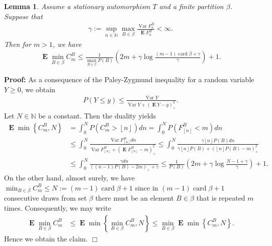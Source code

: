 \documentclass[a4paper,12pt]{article}
\newcommand{\okra}[1]{\left( #1 \right)}
\newcommand{\klam}[1]{\left\{ #1 \right\}}
\newcommand{\floor}[1]{\left\lfloor #1 \right\rfloor}
\DeclareMathOperator{\card}{card}
\DeclareMathOperator{\var}{Var}
\DeclareMathOperator{\mean}{\mathbf{E}}
\newtheorem{lemma}{Lemma}
\newenvironment*{proof}{\begin{trivlist}\item[]
\noindent\textbf{Proof:}}{$\Box$\par\end{trivlist}}
\begin{document}
\begin{lemma}
  \label{theoShortMemory}
  Assume a stationary automorphism $T$ and a finite partition $\beta$.
  Suppose that
  \begin{align}
    \gamma:=
    \sup_{n\in\mathbb{N}}\max_{B\in\beta}\frac{\var F^B_n}{\mean F^B_n}<\infty.
  \end{align}
  Then for $m>1$, we have
  \begin{align}
    \mean \min_{B\in\beta} C^B_m\le
    \frac{1}{\max_{B\in\beta} P(B)}\okra{
    2m+\gamma\log\frac{(m-1)\card\beta+\gamma}{\gamma}
    }+1
    .
  \end{align}
\end{lemma}
\begin{proof}
  As a consequence of the Paley-Zygmund inequality for a random
  variable $Y\ge 0$, we obtain
  \begin{align}
    P(Y\le y)\le\frac{\var Y}{\var Y+(\mean Y-y)_+^2}.
  \end{align}
  Let $N\in\mathbb{N}$ be a constant. Then the duality yields
  \begin{align}
    \mean \min\klam{C^B_m,N}
    &=
    \int_0^{N} P(C^B_m>\floor{n}) dn
    =
      \int_0^{N} P(F^B_{\floor{n}}<m) dn
      \nonumber\\
    &\le \int_0^{N} \frac{\var F^B_{\floor{n}}
      dn}{\var F^B_{\floor{n}}+(\mean F^B_{\floor{n}}-m)_+^2}
    \le \int_0^{N} \frac{\gamma \floor{n}P(B)
      dn}{\gamma \floor{n}P(B)+(\floor{n}P(B)-m)_+^2}
      \nonumber\\
    &\le \int_0^{N}
      \frac{\gamma dn}{((n-1)P(B)-2m)_++\gamma}
      \le \frac{1}{P(B)}\okra{2m+
      \gamma\log\frac{N-1+\gamma}{\gamma}}+1
      .
  \end{align}
  On the other hand, almost surely, we have
  $\min_{B\in\beta} C^B_m\le N:=(m-1)\card\beta+1$
  since in $(m-1)\card\beta+1$ consecutive draws from set $\beta$
  there must be an element $B\in\beta$ that is repeated $m$ times.
  Consequently, we may write
  \begin{align}
    \mean \min_{B\in\beta} C^B_m
    &\le \mean \min\klam{\min_{B\in\beta} C^B_m,N}
      \le \min_{B\in\beta} \mean \min\klam{C^B_m, N}
      .
  \end{align}
  Hence we obtain the claim.
\end{proof}
\end{document}
